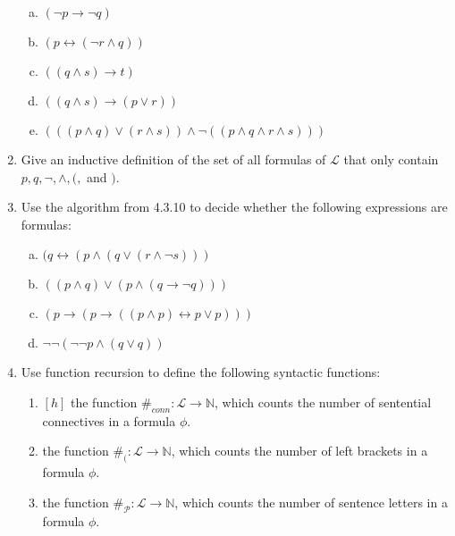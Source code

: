 \begin{enumerate}[\thesection.1]
\begin{enumerate}[(a)]
			\item $(\neg p\to \neg q)$
			
			\item $(p\leftrightarrow (\neg r\land q))$
			
			\item $((q\land s)\to t)$
		
			\item $((q\land s)\to (p\lor r))$
			
			\item $(((p\land q)\lor (r\land s))\land \neg ((p\land q\land r\land s)))$
		
		\end{enumerate}
		
		\item Give an inductive definition of the set of all formulas of $\mathcal{L}$ that only contain $p,q,\neg,\land,(,$ and $)$.
		
		\item Use the algorithm from 4.3.10 to decide whether the following expressions are formulas:
		
		\begin{enumerate}[(a)]
		
			\item $(q\leftrightarrow (p\land (q\lor (r\land \neg s)))$
		
			
			\item $((p\land q)\lor (p\land (q\to\neg q)))$
			
			\item $(p\to (p\to ((p\land p)\leftrightarrow p\lor p)))$
			
			\item $\neg\neg (\neg\neg p\land (q\lor q) )$
			
		\end{enumerate}
		
		\item Use function recursion to define the following syntactic functions:
		
		\begin{enumerate}
		
			\item $[h]$ the function $\#_{conn}:\mathcal{L}\to\mathbb{N}$, which counts the number of sentential connectives in a formula $\phi$.
			
			\item the function $\#_(:\mathcal{L}\to\mathbb{N}$, which counts the number of left brackets in a formula $\phi$. 
			
			\item the function $\#_{\mathcal{P}}:\mathcal{L}\to\mathbb{N}$, which counts the number of sentence letters in a formula $\phi$.
			

\end{enumerate}
\end{enumerate}
